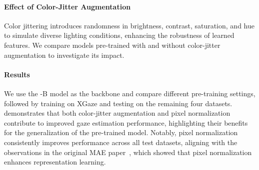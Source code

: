 \paragraph{Effect of Color-Jitter Augmentation}\label{sec:ablation_augmentation}
Color jittering introduces randomness in brightness, contrast, saturation, and hue to simulate diverse lighting conditions, enhancing the robustness of learned features.
We compare models pre-trained with and without color-jitter augmentation to investigate its impact.

\paragraph{Results}
We use the \methodname-B model as the backbone and compare different pre-training settings, followed by training on XGaze and testing on the remaining four datasets.
 demonstrates that both color-jitter augmentation and pixel normalization contribute to improved gaze estimation performance, highlighting their benefits for the generalization of the pre-trained model.
Notably, pixel normalization consistently improves performance across all test datasets, aligning with the observations in the original MAE paper~\cite{he2022masked}, which showed that pixel normalization enhances representation learning.



\begin{table}[t]
    \centering
    \caption{
        Ablation studies on the pre-training, comparing the effect of the color-jitter augmentation and the pixel normalization.
        During the gaze estimation training, we train the model using XGaze and test on the other four datasets to evaluate the generalizability.
    }
\label{table:ablation_colorjitter_pixelnorm}
\end{table}




